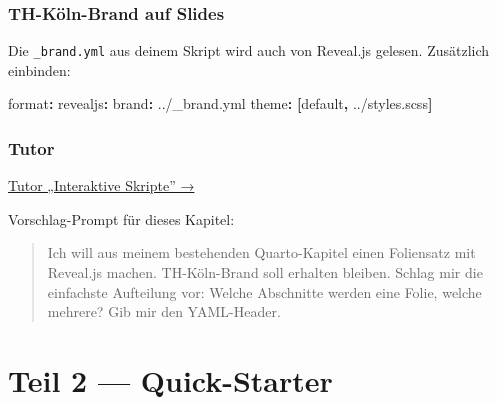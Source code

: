 \documentclass[
  ngerman,
  a4paper,
  DIV=11]{scrreprt}
\newenvironment{Shaded}{\begin{snugshade}}{\end{snugshade}}
\newcommand{\AttributeTok}[1]{\textcolor[rgb]{0.40,0.45,0.13}{#1}}
\newcommand{\FunctionTok}[1]{\textcolor[rgb]{0.28,0.35,0.67}{#1}}
\newcommand{\KeywordTok}[1]{\textcolor[rgb]{0.00,0.23,0.31}{\textbf{#1}}}
\begin{document}
\section{TH-Köln-Brand auf Slides}\label{th-kuxf6ln-brand-auf-slides}

Die \texttt{\_brand.yml} aus deinem Skript wird auch von Reveal.js
gelesen. Zusätzlich einbinden:

\begin{Shaded}
\begin{Highlighting}[]
\FunctionTok{format}\KeywordTok{:}
\AttributeTok{  }\FunctionTok{revealjs}\KeywordTok{:}
\AttributeTok{    }\FunctionTok{brand}\KeywordTok{:}\AttributeTok{ ../\_brand.yml}
\AttributeTok{    }\FunctionTok{theme}\KeywordTok{:}\AttributeTok{ }\KeywordTok{[}\AttributeTok{default}\KeywordTok{,}\AttributeTok{ ../styles.scss}\KeywordTok{]}
\end{Highlighting}
\end{Shaded}

\section{Tutor}\label{tutor-6}

\begin{tcolorbox}[enhanced jigsaw, opacitybacktitle=0.6, leftrule=.75mm, title=\textcolor{quarto-callout-tip-color}{\faLightbulb}\hspace{0.5em}{Tutor öffnen}, colframe=quarto-callout-tip-color-frame, arc=.35mm, toprule=.15mm, colbacktitle=quarto-callout-tip-color!10!white, bottomrule=.15mm, colback=white, rightrule=.15mm, breakable, toptitle=1mm, bottomtitle=1mm, opacityback=0, titlerule=0mm, coltitle=black, left=2mm]

\href{https://chatgpt.com/g/g-69fec93348108191af1ffb8ce0cf6712-tutor-interaktive-skripte}{Tutor
„Interaktive Skripte'' →}

Vorschlag-Prompt für dieses Kapitel:

\begin{quote}
Ich will aus meinem bestehenden Quarto-Kapitel einen Foliensatz mit
Reveal.js machen. TH-Köln-Brand soll erhalten bleiben. Schlag mir die
einfachste Aufteilung vor: Welche Abschnitte werden eine Folie, welche
mehrere? Gib mir den YAML-Header.
\end{quote}

\end{tcolorbox}

\part{Teil 2 --- Quick-Starter}
\end{document}

